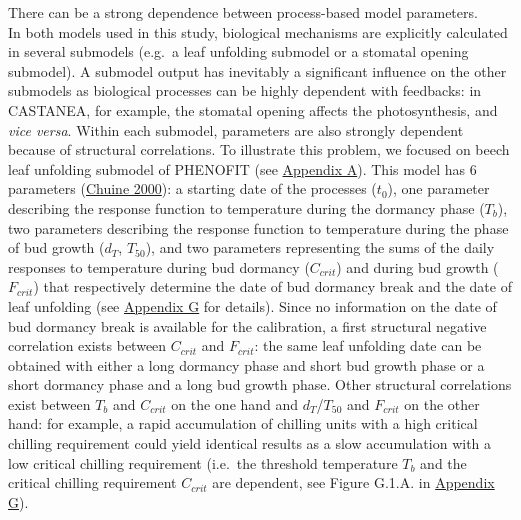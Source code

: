 \documentclass[11pt,]{article}
\begin{document}
There can be a strong dependence between process-based model
parameters.\\
In both models used in this study, biological mechanisms are explicitly
calculated in several submodels (e.g.~a leaf unfolding submodel or a
stomatal opening submodel). A submodel output has inevitably a
significant influence on the other submodels as biological processes can
be highly dependent with feedbacks: in CASTANEA, for example, the
stomatal opening affects the photosynthesis, and \emph{vice versa}.
Within each submodel, parameters are also strongly dependent because of
structural correlations. To illustrate this problem, we focused on beech
leaf unfolding submodel of PHENOFIT (see
\protect\hyperlink{appendixA}{Appendix A}). This model has 6 parameters
(\protect\hyperlink{ref-Chuine2000}{Chuine 2000}): a starting date of
the processes (\(t_0\)), one parameter describing the response function
to temperature during the dormancy phase (\(T_b\)), two parameters
describing the response function to temperature during the phase of bud
growth (\(d_T\), \(T_{50}\)), and two parameters representing the sums
of the daily responses to temperature during bud dormancy (\(C_{crit}\))
and during bud growth (\(F_{crit}\)) that respectively determine the
date of bud dormancy break and the date of leaf unfolding (see
\protect\hyperlink{appendixG}{Appendix G} for details). Since no
information on the date of bud dormancy break is available for the
calibration, a first structural negative correlation exists between
\(C_{crit}\) and \(F_{crit}\): the same leaf unfolding date can be
obtained with either a long dormancy phase and short bud growth phase or
a short dormancy phase and a long bud growth phase. Other structural
correlations exist between \(T_b\) and \(C_{crit}\) on the one hand and
\(d_T\)/\(T_{50}\) and \(F_{crit}\) on the other hand: for example, a
rapid accumulation of chilling units with a high critical chilling
requirement could yield identical results as a slow accumulation with a
low critical chilling requirement (i.e.~the threshold temperature
\(T_{b}\) and the critical chilling requirement \(C_{crit}\) are
dependent, see Figure G.1.A. in \protect\hyperlink{appendixG}{Appendix
G}).
\end{document}
